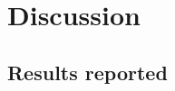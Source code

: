 \section{Discussion} \label{sec:discussion}

\subsection{Results reported}


\begin{figure}
\centering
%
%
%
%
%
%
%
%
%

\end{figure}
